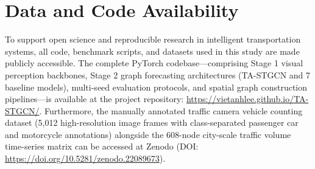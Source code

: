 \documentclass[preprint,12pt]{elsarticle}
\begin{document}
\section*{Data and Code Availability}
To support open science and reproducible research in intelligent transportation systems, all code, benchmark scripts, and datasets used in this study are made publicly accessible. The complete PyTorch codebase—comprising Stage 1 visual perception backbones, Stage 2 graph forecasting architectures (TA-STGCN and 7 baseline models), multi-seed evaluation protocols, and spatial graph construction pipelines—is available at the project repository: \url{https://vietanhlee.github.io/TA-STGCN/}. Furthermore, the manually annotated traffic camera vehicle counting dataset (5,012 high-resolution image frames with class-separated passenger car and motorcycle annotations) alongside the 608-node city-scale traffic volume time-series matrix can be accessed at Zenodo (DOI: \url{https://doi.org/10.5281/zenodo.22089673}).



\end{document}
